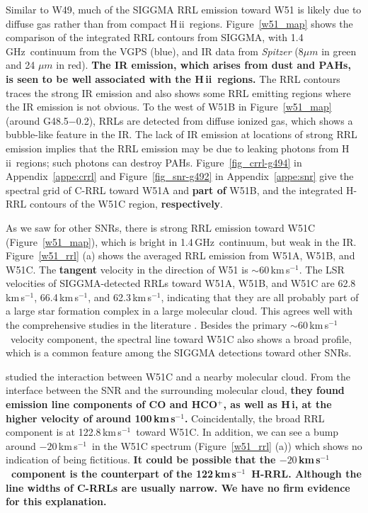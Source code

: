 \documentclass[manuscript]{aastex61}
\newcommand{\hii}{{\rm H\,}{{\sc ii}}}
\newcommand{\hi}{{\rm H\,}{{\sc i}}}
\newcommand{\kms}{\,km\,s$^{-1}$}
\newcommand{\ghz}{\,GHz}
\newcommand{\um}{\mu m}
\begin{document}
Similar to W49, much of the SIGGMA RRL emission toward W51 is likely due to diffuse gas rather than from compact \hii\ regions.
Figure~\ref{w51_map} shows the comparison of the integrated RRL contours from SIGGMA, with 1.4\ghz\ continuum from the VGPS (blue), and  IR data from {\it Spitzer} (8$\um$ in green and 24 $\um$ in red).
\textbf{The IR emission, which arises from dust and PAHs, is seen to be well associated with the \hii\ regions.}
The RRL contours traces the strong IR emission and also shows some RRL emitting regions where the IR emission is not obvious.
To the west of W51B in Figure~\ref{w51_map} (around G48.5$-$0.2), RRLs are detected from diffuse ionized gas, which shows a bubble-like feature in the IR.
The lack of IR emission at locations of strong RRL emission implies that the RRL emission may be due to leaking photons from \hii\ regions; such photons can destroy PAHs.
Figure~\ref{fig_crrl-g494} in Appendix~\ref{appe:crrl} and Figure~\ref{fig_snr-g492} in Appendix~\ref {appe:snr} give the spectral grid of C-RRL toward W51A and \textbf{part of} W51B, and the integrated H-RRL contours of the W51C region, \textbf{respectively}.

As we saw for other SNRs, there is strong RRL emission toward W51C (Figure~\ref{w51_map}), which is bright in 1.4\ghz\ continuum, but weak in the IR.
Figure~\ref{w51_rrl} (a) shows the averaged RRL emission from W51A, W51B, and W51C.
The \textbf{tangent} velocity in the direction of W51 is $\sim60$\kms.
The LSR velocities of SIGGMA-detected RRLs toward W51A, W51B, and W51C are 62.8\kms, 66.4\kms, and 62.3\kms, indicating that they are all probably part of a large star formation complex in a large molecular cloud.
This agrees well with the comprehensive studies in the literature \citep{Mufson1979, Mehringer1994, Brogan2013}.
Besides the primary $\sim60$\kms\ velocity component, the spectral line toward W51C also shows a broad profile, which is a common feature among the SIGGMA detections toward other SNRs.

\citet{Koo1997a, Koo1997b} studied the interaction between W51C and a nearby molecular cloud.
From the interface between the SNR and the surrounding molecular cloud, \textbf{they found emission line components of CO and HCO$^{+}$, as well as \hi, at the higher velocity of around 100\kms.}
Coincidentally, the broad RRL component is at 122.8\kms\ toward W51C.
In addition, we can see a bump around $-20$\kms\ in the W51C spectrum (Figure~\ref{w51_rrl} (a)) which shows no indication of being fictitious. 
\textbf{It could be possible that the $-20$\kms\ component is the counterpart of the 122\kms\ H-RRL. Although the line widths of C-RRLs are usually narrow.
We have no firm evidence for this explanation.}
\end{document}
